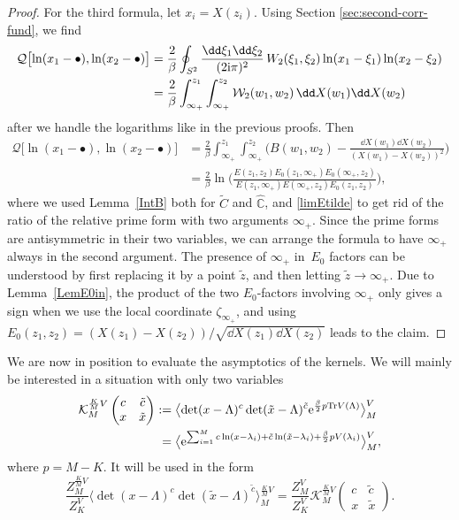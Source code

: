 \documentclass[pdftex]{sigma}
\numberwithin{equation}{section}
\begin{document}
\begin{proof}
For the third formula, let $x_i = X(z_i)$. Using Section \ref{sec:second-corr-fund}, we find
\begin{align*}
 \mathcal{Q}\bigl[\ln(x_1 - \bullet), \ln(x_2 - \bullet)\bigr] &{} = \frac{2}{\beta} \oint_{S^2} \frac{\dd \xi_1\dd \xi_2}{(2{\rm i}\pi)^2}\,W_2(\xi_1,\xi_2) \ln(x_1 - \xi_1)\ln(x_2 - \xi_2) \\
 &{} = \frac{2}{\beta} \int_{\infty_+}^{z_1} \int_{\infty_+}^{z_2} \mathcal{W}_2(w_1,w_2)\,\dd X(w_1) \dd X(w_2)
\end{align*}
after we handle the logarithms like in the previous proofs. Then
\begin{align*}
 \mathcal{Q}\bigl[\ln(x_1 - \bullet), \ln(x_2 - \bullet)\bigr] &{} = \frac{2}{\beta} \int_{\infty_+}^{z_1} \int_{\infty_+}^{z_2} \biggl(B(w_1,w_2) - \frac{\dd X(w_1)\dd X(w_2)}{(X(w_1) - X(w_2))^2}\biggr) \\
 &{} = \frac{2}{\beta} \ln\biggl(\frac{E(z_1,z_2)E_0(z_1,\infty_+)E_0(\infty_+,z_2)}{E(z_1,\infty_+)E(\infty_+,z_2)E_0(z_1,z_2)}\biggr),
\end{align*}
where we used Lemma~\ref{IntB} both for $\widetilde{C}$ and $\widehat{\mathbb{C}}$, and \eqref{limEtilde} to get rid of the ratio of the relative prime form with two arguments $\infty_+$. Since the prime forms are antisymmetric in their two variables, we can arrange the formula to have $\infty_+$ always in the second argument. The presence of $\infty_+$ in~$E_0$ factors can be understood by first replacing it by a point $\tilde{z}$, and then letting $\tilde{z} \rightarrow \infty_+$. Due to Lemma~\ref{LemE0in}, the product of the two $E_0$-factors involving $\infty_+$ only gives a sign when we use the local coordinate $\zeta_{\infty_+}$, and using $E_0(z_1,z_2) = (X(z_1) - X(z_2))/\sqrt{\dd X(z_1)\dd X(z_2)}$ leads to the claim.
\end{proof}


We are now in position to evaluate the asymptotics of the kernels. We will mainly be interested in a situation with only two variables
\begin{align}
\nonumber
 \mathcal{K}_{M}^{\frac{K}{M}V}\left(\begin{matrix} c & \tilde{c} \\ x & \tilde{x} \end{matrix}\right) :={}& \bigl\langle \det(x - \Lambda)^c \det(\tilde{x} - \Lambda)^{\tilde{c}}{\rm e}^{\frac{\beta}{2}p{\rm Tr} V(\Lambda)}\bigr\rangle_M^V \\
={} & \bigl\langle{\rm e}^{\sum_{i = 1}^M c\ln(x - \lambda_i) + \tilde{c}\ln(\tilde{x} - \lambda_i) + \frac{\beta}{2}pV(\lambda_i)}\bigr\rangle_M^V,\label{Kmcc}
\end{align}
where $p = M - K$. It will be used in the form
\begin{equation}
\label{Krat}
\frac{Z_M^{\frac{K}{M}V}}{Z_K^V} \bigl\langle\det(x - \Lambda)^c\det(\tilde{x} - \Lambda)^{\tilde{c}}\bigr\rangle_M^{\frac{K}{M}V} = \frac{Z_M^V}{Z_K^V} \mathcal{K}_{M}^{\frac{K}{M}V}\left(\begin{matrix} c & \tilde{c} \\ x & \tilde{x}\end{matrix}\right).
\end{equation}
\end{document}
